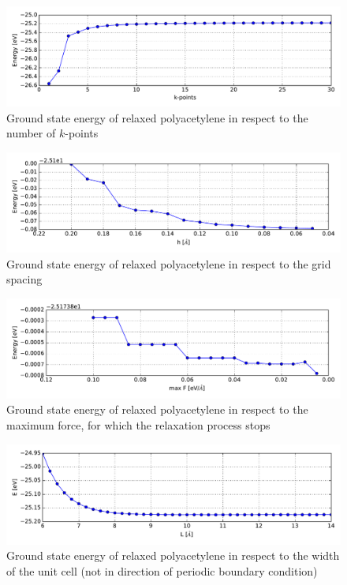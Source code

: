\begin{figure}[!p]
	\centering
	\includegraphics[width = 12cm]{Images/polyacetylene/convergence/kpts-energy}
	\caption{Ground state energy of relaxed polyacetylene in respect to the number of $k$-points}
	\label{image_poly_kpts_energy}
\end{figure}
\begin{figure}[!p]
	\centering
	\includegraphics[width = 12cm]{Images/polyacetylene/convergence/gridspacing-energy}
	\caption{Ground state energy of relaxed polyacetylene in respect to the grid spacing}
	\label{image_poly_grid_energy}
\end{figure}
\begin{figure}[!p]
	\centering
	\includegraphics[width = 12cm]{Images/polyacetylene/convergence/forces-energy}
	\caption{Ground state energy of relaxed polyacetylene in respect to the maximum force, for which the relaxation process stops}
	\label{image_poly_force_energy}
\end{figure}
\begin{figure}[!p]
	\centering
	\includegraphics[width = 12cm]{Images/polyacetylene/convergence/unit_cell_width}
	\caption{Ground state energy of relaxed polyacetylene in respect to the width of the unit cell (not in direction of periodic boundary condition)}
	\label{image_poly_width_energy}
\end{figure}

